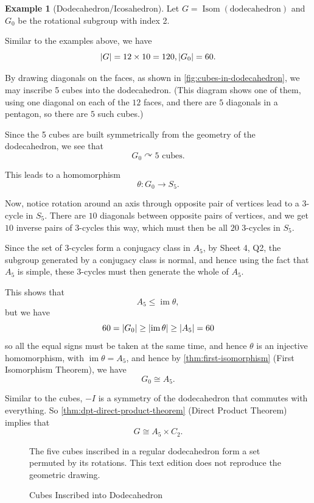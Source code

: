 \documentclass{article}
\theoremstyle{definition}
\newtheorem*{example*}{Example}
\theoremstyle{remark}
\DeclarePairedDelimiter{\abs}{\lvert}{\rvert}
\newcommand{\pqty}[1]{\left(#1\right)}
\newcommand{\functiondomain}[3]{#1:#2\to #3}
\newcommand{\isomorphic}{\cong}
\newcommand{\subgroup}{\leq}
\newcommand{\actson}{\curvearrowright}
\newcommand{\img}{\operatorname{im}}
\newcommand{\identityM}{I}
\newcommand{\Isom}{\operatorname{Isom}}
\begin{document}
\begin{example*}[Dodecahedron/Icosahedron]
    Let \(G = \Isom \pqty{\text{dodecahedron}}\) and \(G_0\) be the rotational subgroup with index 2.

    Similar to the examples above, we have
    \[
        \abs{G} = 12 \times 10 = 120, \abs{G_0} = 60.
    \]

    By drawing diagonals on the faces, as shown in \autoref{fig:cubes-in-dodecahedron}, we may inscribe 5 cubes into the dodecahedron. (This diagram shows one of them, using one diagonal on each of the \(12\) faces, and there are \(5\) diagonals in a pentagon, so there are \(5\) such cubes.)

    Since the 5 cubes are built symmetrically from the geometry of the dodecahedron, we see that
    \[
        G_0 \actson 5 \text{ cubes}.
    \]

    This leads to a homomorphism
    \[
        \functiondomain{\theta}{G_0}{S_5}.
    \]

    Now, notice rotation around an axis through opposite pair of vertices lead to a \(3\)-cycle in \(S_5\). There are \(10\) diagonals between opposite pairs of vertices, and we get \(10\) inverse pairs of \(3\)-cycles this way, which must then be all \(20\) \(3\)-cycles in \(S_5\).

    Since the set of \(3\)-cycles form a conjugacy class in \(A_5\), by Sheet 4, Q2, the subgroup generated by a conjugacy class is normal, and hence using the fact that \(A_5\) is simple, these \(3\)-cycles must then generate the whole of \(A_5\).

    This shows that
    \[
        A_5 \subgroup \img \theta,
    \]
    but we have
    \[
        60 = \abs{G_0} \geq \abs{\img \theta} \geq \abs{A_5} = 60
    \]
    so all the equal signs must be taken at the same time, and hence \(\theta\) is an injective homomorphism, with \(\img \theta = A_5\), and hence by \autoref{thm:first-isomorphism} (First Isomorphism Theorem), we have
    \[
        G_0 \isomorphic A_5.
    \]

    Similar to the cubes, \(-\identityM\) is a symmetry of the dodecahedron that commutes with everything. So \autoref{thm:dpt-direct-product-theorem} (Direct Product Theorem) implies that
    \[
        G \isomorphic A_5 \times C_2.
    \]
\end{example*}

\begin{figure}[ht!]
    \centering
    \par The five cubes inscribed in a regular dodecahedron form a set permuted by its rotations. This text edition does not reproduce the geometric drawing.\par

    \caption{Cubes Inscribed into Dodecahedron}
    \label{fig:cubes-in-dodecahedron}
\end{figure}
\end{document}
